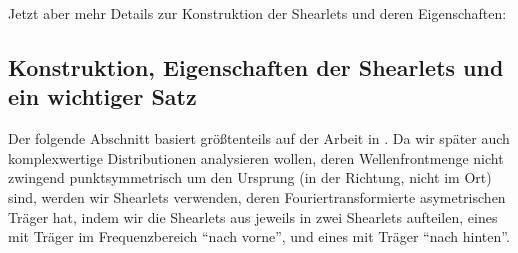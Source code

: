 Jetzt aber mehr Details zur Konstruktion der Shearlets und deren Eigenschaften:


\subsection{Konstruktion, Eigenschaften der Shearlets und ein wichtiger Satz} %
\label{sec:konstruktion_und_eigenschaften_der_shearlets}

Der folgende Abschnitt basiert größtenteils auf der Arbeit in \textcite{Kutyniok2008}.
 Da wir später auch komplexwertige Distributionen analysieren wollen, deren Wellenfrontmenge nicht zwingend punktsymmetrisch um den Ursprung (in der Richtung, nicht im Ort) sind, werden wir Shearlets verwenden, deren Fouriertransformierte asymetrischen Träger hat, indem wir die Shearlets aus \cite{Kutyniok2008} jeweils in zwei Shearlets aufteilen, eines mit Träger im Frequenzbereich "`nach vorne"', und eines mit Träger "`nach hinten"'. 

